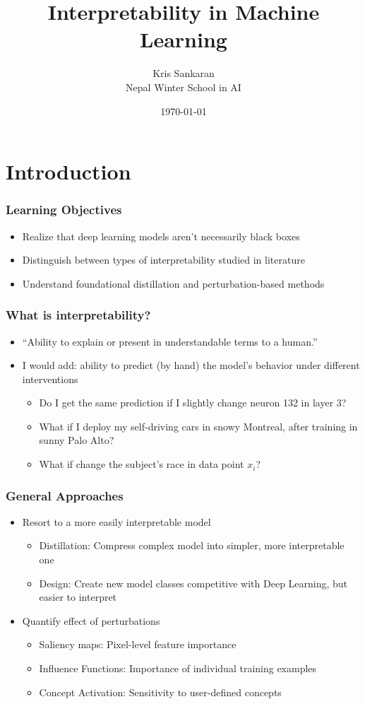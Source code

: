 \documentclass[10pt,mathserif]{beamer}
\title{\large \bfseries Interpretability in Machine Learning}
\author{Kris Sankaran\\[3ex]
Nepal Winter School in AI}
\date{\today}
\begin{document}
\frame{
  \thispagestyle{empty}
  \titlepage
}

\section{Introduction}

\begin{frame}
  \frametitle{Learning Objectives}
 \begin{itemize}
   \item Realize that deep learning models aren't necessarily black boxes
   \item Distinguish between types of interpretability studied in literature
   \item Understand foundational distillation and perturbation-based methods
 \end{itemize}
\end{frame}

\begin{frame}
  \frametitle{What is interpretability?}
  \begin{itemize}
  \item ``Ability to explain or present in
    understandable terms to a human.''
  \item I would add: ability to predict (by hand) the model's behavior under
    different interventions
    \begin{itemize}
      \item Do I get the same prediction if I slightly change neuron 132 in
        layer 3?
      \item What if I deploy my self-driving cars in snowy Montreal, after
        training in sunny Palo Alto?
      \item What if change the subject's race in data point $x_i$?
    \end{itemize}
  \end{itemize}
\end{frame}

\begin{frame}
  \frametitle{General Approaches}
  \begin{itemize}
  \item Resort to a more easily interpretable model
    \begin{itemize}
    \item Distillation: Compress complex model into simpler, more interpretable
      one
    \item Design: Create new model classes competitive with Deep Learning, but
      easier to interpret
    \end{itemize}
  \item Quantify effect of perturbations
    \begin{itemize}
    \item Saliency maps: Pixel-level feature importance
    \item Influence Functions: Importance of individual training examples
    \item Concept Activation: Sensitivity to user-defined concepts
    \end{itemize}
  \end{itemize}
\end{frame}
\end{document}
